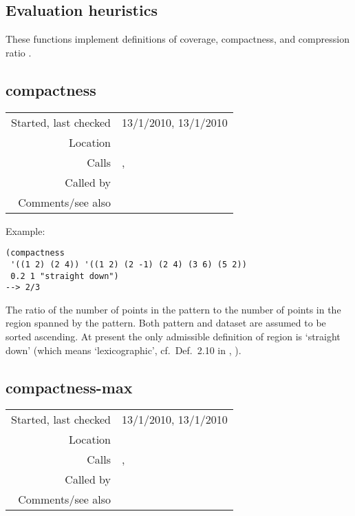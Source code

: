 \subsection{Evaluation heuristics}\label{sec:evaluation-heuristics}

These functions implement definitions of coverage,
compactness, and compression ratio
\citep{meredith2003,forth2009}.


\subsection*{compactness}\label{fun:compactness}

\vspace{0.3cm}
\begin{tabular}{r|p{8cm}}
Started, last checked & 13/1/2010, 13/1/2010 \\
Location & \nameref{sec:evaluation-heuristics} \\
Calls & \nameref{fun:index-item-1st-occurs}, \nameref{fun:my-last} \\
Called by & \\
Comments/see also & \nameref{fun:compact-subpatterns-more-output}
\end{tabular}

\vspace{0.5cm}
\noindent Example:
\begin{verbatim}
(compactness
 '((1 2) (2 4)) '((1 2) (2 -1) (2 4) (3 6) (5 2))
 0.2 1 "straight down")
--> 2/3
\end{verbatim}

\noindent The ratio of the number of points in the
pattern to the number of points in the region spanned
by the pattern. Both pattern and dataset are assumed
to be sorted ascending. At present the only admissible
definition of region is `straight down' (which means
`lexicographic', cf.~Def.~2.10 in
\citeauthor{collins2011b},
\citeyear{collins2011b}).


\subsection*{compactness-max}\label{fun:compactness-max}

\vspace{0.3cm}
\begin{tabular}{r|p{8cm}}
Started, last checked & 13/1/2010, 13/1/2010 \\
Location & \nameref{sec:evaluation-heuristics} \\
Calls & \nameref{fun:compactness-min-max}, \nameref{fun:translation} \\
Called by & \nameref{fun:heuristics-pattern-translators-pair} \\
Comments/see also &
\end{tabular}

